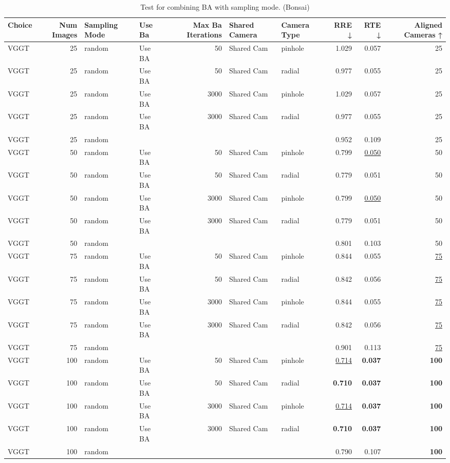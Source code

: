 \begin{table}[H]
\caption{Test for combining BA with sampling mode. (Bonsai)}
\label{tab:99_ba_sampling_mode_bonsai}
\begin{tabular}{lrllrllrrr}
\toprule
Choice & Num Images & Sampling Mode & Use Ba & Max Ba Iterations & Shared Camera & Camera Type & RRE ↓ & RTE ↓ & Aligned Cameras ↑ \\
\midrule
VGGT & 25 & random & Use BA & 50 & Shared Cam & pinhole & 1.029 & 0.057 & 25 \\
VGGT & 25 & random & Use BA & 50 & Shared Cam & radial & 0.977 & 0.055 & 25 \\
VGGT & 25 & random & Use BA & 3000 & Shared Cam & pinhole & 1.029 & 0.057 & 25 \\
VGGT & 25 & random & Use BA & 3000 & Shared Cam & radial & 0.977 & 0.055 & 25 \\
VGGT & 25 & random &  &  &  &  & 0.952 & 0.109 & 25 \\
VGGT & 50 & random & Use BA & 50 & Shared Cam & pinhole & 0.799 & \underline{0.050} & 50 \\
VGGT & 50 & random & Use BA & 50 & Shared Cam & radial & 0.779 & 0.051 & 50 \\
VGGT & 50 & random & Use BA & 3000 & Shared Cam & pinhole & 0.799 & \underline{0.050} & 50 \\
VGGT & 50 & random & Use BA & 3000 & Shared Cam & radial & 0.779 & 0.051 & 50 \\
VGGT & 50 & random &  &  &  &  & 0.801 & 0.103 & 50 \\
VGGT & 75 & random & Use BA & 50 & Shared Cam & pinhole & 0.844 & 0.055 & \underline{75} \\
VGGT & 75 & random & Use BA & 50 & Shared Cam & radial & 0.842 & 0.056 & \underline{75} \\
VGGT & 75 & random & Use BA & 3000 & Shared Cam & pinhole & 0.844 & 0.055 & \underline{75} \\
VGGT & 75 & random & Use BA & 3000 & Shared Cam & radial & 0.842 & 0.056 & \underline{75} \\
VGGT & 75 & random &  &  &  &  & 0.901 & 0.113 & \underline{75} \\
VGGT & 100 & random & Use BA & 50 & Shared Cam & pinhole & \underline{0.714} & \textbf{0.037} & \textbf{100} \\
VGGT & 100 & random & Use BA & 50 & Shared Cam & radial & \textbf{0.710} & \textbf{0.037} & \textbf{100} \\
VGGT & 100 & random & Use BA & 3000 & Shared Cam & pinhole & \underline{0.714} & \textbf{0.037} & \textbf{100} \\
VGGT & 100 & random & Use BA & 3000 & Shared Cam & radial & \textbf{0.710} & \textbf{0.037} & \textbf{100} \\
VGGT & 100 & random &  &  &  &  & 0.790 & 0.107 & \textbf{100} \\
\bottomrule
\end{tabular}
\end{table}

